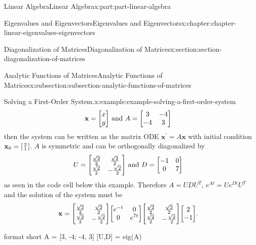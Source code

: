 \documentclass[twoside,10pt,]{book}
\numberwithin{equation}{part}
\newcommand{\xx}{\mathbf{x}}
\begin{document}
\begin{partptx}{Linear Algebra}{}{Linear Algebra}{}{}{x:part:part-linear-algebra}
\begin{chapterptx}{Eigenvalues and Eigenvectors}{}{Eigenvalues and Eigenvectors}{}{}{x:chapter:chapter-linear-eigenvalues-eigenvectors}
\begin{sectionptx}{Diagonalization of Matrices}{}{Diagonalization of Matrices}{}{}{x:section:section-diagonalization-of-matrices}
\begin{subsectionptx}{Analytic Functions of Matrices}{}{Analytic Functions of Matrices}{}{}{x:subsection:subsection-analytic-functions-of-matrices}
\begin{example}{Solving a First-Order System.}{x:example:example-solving-a-first-order-system}
\begin{equation*}
\xx = \mqty[x \\ y]\text{ and }A = \mqty[3 & -4 \\ -4 & 3]
\end{equation*}
then the system can be written as the matrix ODE \(\xx^\prime = A\xx\) with initial condition \(\xx_0 = \smqty[2 \\ 1]\). \(A\) is symmetric and can be orthogonally diagonalized by%
\begin{equation*}
U = \mqty[\frac{\sqrt{2}}{2} & \frac{\sqrt{2}}{2} \\ \frac{\sqrt{2}}{2} & -\frac{\sqrt{2}}{2}]\text{ and } D = \mqty[-1 & 0 \\ 0 & 7]
\end{equation*}
as seen in the code cell below this example. Therefore \(A = UDU^T\), \(e^{At} = Ue^{Dt}U^T\) and the solution of the system must be%
\begin{equation*}
\xx = \mqty[\frac{\sqrt{2}}{2} & \frac{\sqrt{2}}{2} \\ \frac{\sqrt{2}}{2} & -\frac{\sqrt{2}}{2}]\mqty[e^{-t} & 0 \\ 0 & e^{7t}]\mqty[\frac{\sqrt{2}}{2} & \frac{\sqrt{2}}{2} \\ \frac{\sqrt{2}}{2} & -\frac{\sqrt{2}}{2}]\mqty[2 \\ -1]\text{.}
\end{equation*}
%
\end{example}
\begin{sageinput}
format short
A = [3, -4; -4, 3]
[U,D] = eig(A)
\end{sageinput}
\end{subsectionptx}
\end{sectionptx}
\end{chapterptx}
 \end{partptx}
%
%
\typeout{************************************************}
\typeout{************************************************}
%
\end{document}
